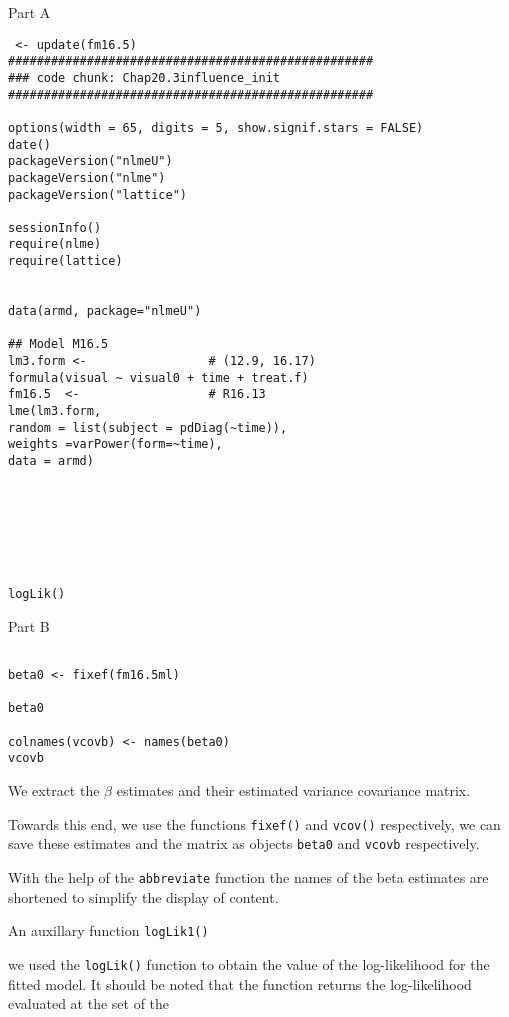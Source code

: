 \documentclass[a4paper,12pt]{article}
\begin{document}
Part A
\begin{framed}
\begin{verbatim}
 <- update(fm16.5)
###################################################
### code chunk: Chap20.3influence_init
###################################################

options(width = 65, digits = 5, show.signif.stars = FALSE)
date()
packageVersion("nlmeU")
packageVersion("nlme")
packageVersion("lattice")

sessionInfo()
require(nlme)    
require(lattice) 


data(armd, package="nlmeU")

## Model M16.5 
lm3.form <-                 # (12.9, 16.17)
formula(visual ~ visual0 + time + treat.f) 
fm16.5  <-                  # R16.13
lme(lm3.form,              
random = list(subject = pdDiag(~time)),       
weights =varPower(form=~time),
data = armd)     






  
logLik()
\end{verbatim}
\end{framed}


Part B

\begin{framed}
\begin{verbatim}

beta0 <- fixef(fm16.5ml)

beta0

colnames(vcovb) <- names(beta0)
vcovb

\end{verbatim}
\end{framed}

We extract the \textbf{$\beta$} estimates and their estimated variance covariance matrix.

Towards this end, we use the functions \texttt{fixef()} and \texttt{vcov()} respectively, we can save these estimates and the matrix as objects \texttt{beta0} and 
\texttt{vcovb} respectively.

With the help of the \texttt{abbreviate} function the names of the beta estimates are shortened to simplify the display of content.

An auxillary function \texttt{logLik1()}

we used the \texttt{logLik()} function to obtain the value of the log-likelihood for the fitted model.
It should be noted that the function returns the log-likelihood evaluated at the set of the
\end{document}
